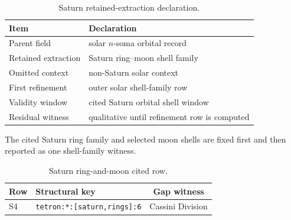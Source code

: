 \begin{table}[H]
\centering
\caption{Saturn retained-extraction declaration.}
\label{tab:saturn-retention}
\begin{threeparttable}
\begin{tabularx}{\linewidth}{@{}lX@{}}
\toprule
Item & Declaration \\
\midrule
Parent field & solar \(n\)-soma orbital record \\
Retained extraction & Saturn ring--moon shell family \\
Omitted context & non-Saturn solar context \\
First refinement & outer solar shell-family row \\
Validity window & cited Saturn orbital shell window \\
Residual witness & qualitative until refinement row is computed \\
\bottomrule
\end{tabularx}
\end{threeparttable}
\end{table}

The cited Saturn ring family and selected moon shells are fixed first and then reported as one shell-family witness.

\begin{table}[H]
\centering
\caption{Saturn ring-and-moon cited row.}
\label{tab:saturn-shell-row}
\begin{threeparttable}
\small
\begin{tabularx}{\linewidth}{@{}lXc@{}}
\toprule
Row & Structural key & Gap witness \\
\midrule
S4 & \texttt{tetron:*:[saturn,rings]:6} & Cassini Division \\
\bottomrule
\end{tabularx}
\end{threeparttable}
\end{table}

